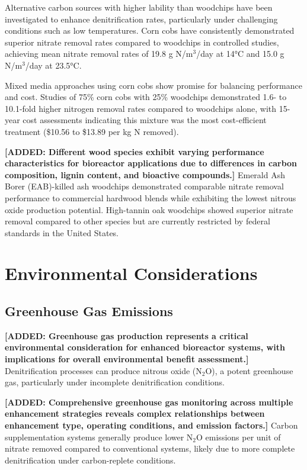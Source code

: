 \documentclass[12pt,a4paper]{article}
\newcommand{\added}[1]{\textcolor{addedtext}{\textbf{[ADDED: #1]}}}
\begin{document}
Alternative carbon sources with higher lability than woodchips have been investigated to enhance denitrification rates, particularly under challenging conditions such as low temperatures. Corn cobs have consistently demonstrated superior nitrate removal rates compared to woodchips in controlled studies, achieving mean nitrate removal rates of 19.8 g N/m$^3$/day at 14°C and 15.0 g N/m$^3$/day at 23.5°C.

Mixed media approaches using corn cobs show promise for balancing performance and cost. Studies of 75\% corn cobs with 25\% woodchips demonstrated 1.6- to 10.1-fold higher nitrogen removal rates compared to woodchips alone, with 15-year cost assessments indicating this mixture was the most cost-efficient treatment (\$10.56 to \$13.89 per kg N removed).

\added{Different wood species exhibit varying performance characteristics for bioreactor applications due to differences in carbon composition, lignin content, and bioactive compounds.} Emerald Ash Borer (EAB)-killed ash woodchips demonstrated comparable nitrate removal performance to commercial hardwood blends while exhibiting the lowest nitrous oxide production potential. High-tannin oak woodchips showed superior nitrate removal compared to other species but are currently restricted by federal standards in the United States.

\section{Environmental Considerations}

\subsection{Greenhouse Gas Emissions}

\added{Greenhouse gas production represents a critical environmental consideration for enhanced bioreactor systems, with implications for overall environmental benefit assessment.} Denitrification processes can produce nitrous oxide (N$_2$O), a potent greenhouse gas, particularly under incomplete denitrification conditions.

\added{Comprehensive greenhouse gas monitoring across multiple enhancement strategies reveals complex relationships between enhancement type, operating conditions, and emission factors.} Carbon supplementation systems generally produce lower N$_2$O emissions per unit of nitrate removed compared to conventional systems, likely due to more complete denitrification under carbon-replete conditions.
\end{document}
